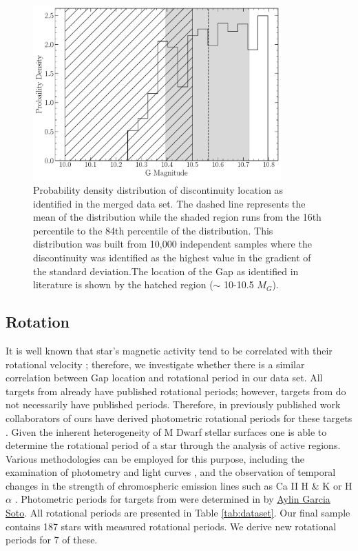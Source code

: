 \begin{figure}
  \centering
  \includegraphics[width=0.85\textwidth]{figures/jaoMagActivity/GapLocationMC.pdf}
  \caption{Probability density distribution of discontinuity location as
  identified in the merged data set. The dashed line represents the mean of the
  distribution while the shaded region runs from the 16th percentile to the
  84th percentile of the distribution. This distribution was built from 10,000
  independent samples where the discontinuity was identified as the highest
  value in the gradient of the standard deviation.The location of the Gap
  as identified in literature is shown by the hatched region ($\sim$ 10-10.5 $M_{G}$).}
  \label{fig:GapLocationMC}
\end{figure}

\subsection{Rotation}
It is well known that star's magnetic activity tend to be correlated with their
rotational velocity \citep{Vaughan1981, Newton2016, Astudillo-Defru2017,
Houdebine2017, Boudreaux2022}; therefore, we investigate whether there is a
similar correlation between Gap location and rotational period in our data set.
All targets from \citet{Boudreaux2022} already have published rotational
periods; however, targets from \citet{Perdelwitz2021} do not necessarily have
published periods. Therefore, in previously published work collaborators of
ours have derived photometric rotational periods for these targets
\citep{Boudreaux2024}. Given the inherent heterogeneity of M Dwarf stellar
surfaces \citep{Boisse2011, Robertson2020} one is able to determine the
rotational period of a star through the analysis of active regions. Various
methodologies can be employed for this purpose, including the examination of
photometry and light curves \citep[e.g.,][]{Newton2016}, and the observation of
temporal changes in the strength of chromospheric emission lines such as Ca II
H \& K or H$\alpha$ \citep[e.g.,][]{2019A&A...623A..24F,2023MNRAS.518.3147K}.
Photometric periods for targets from \citet{Perdelwitz2021} were determined in
\citet{Boudreaux2024} by \href{https://orcid.org/0000-0001-9828-3229}{Aylin
Garcia Soto}. All rotational periods are presented in Table \ref{tab:dataset}.
Our final sample contains 187 stars with measured rotational periods. We derive
new rotational periods for 7 of these. 

